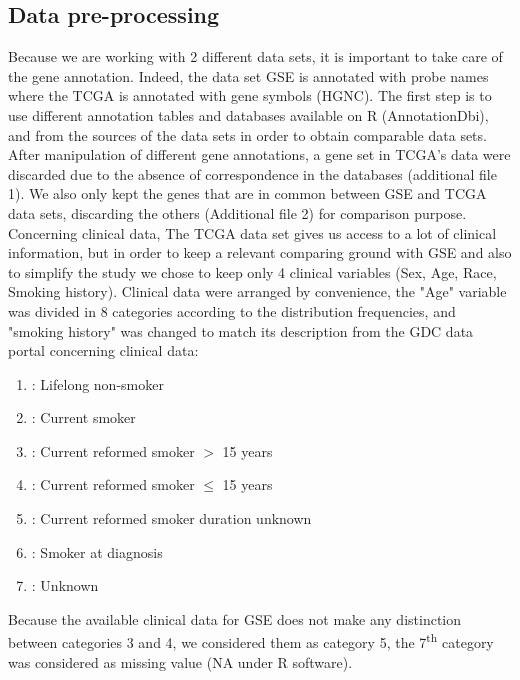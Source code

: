 \documentclass[twocolumn]{article}
\begin{document}
\subsection{Data pre-processing}\label{sec:preprocess}

Because we are working with 2 different data sets, it is important to take care of the gene annotation. Indeed, the data set GSE\cite{shedden} is annotated with probe names where the TCGA\cite{TCGA} is annotated with gene symbols (HGNC).
The first step is to use different annotation tables and databases available on R (AnnotationDbi)\cite{annot}, and from the sources of the data sets in order to obtain comparable data sets.
After manipulation of different gene annotations, a gene set in TCGA's data were discarded due to the absence of correspondence in the databases (additional file 1). We also only kept the genes that are in common between GSE and TCGA data sets, discarding the others (Additional file 2) for comparison purpose.
Concerning clinical data, The TCGA data set gives us access to a lot of clinical information, but in order to keep a relevant comparing ground with GSE and also to simplify the study we chose to keep only 4 clinical variables (Sex, Age, Race, Smoking history).
Clinical data were arranged by convenience, the "Age" variable was divided in 8 categories according to the distribution frequencies, and "smoking history" was changed to match its description from the GDC data portal concerning clinical data:
\begin{enumerate}
    \item : Lifelong non-smoker
    \item : Current smoker
    \item : Current reformed smoker $>$ 15 years
    \item : Current reformed smoker $\leq$ 15 years
    \item : Current reformed smoker duration unknown
    \item : Smoker at diagnosis
    \item : Unknown
\end{enumerate}

Because the available clinical data for GSE does not make any distinction between categories 3 and 4, we considered them as category 5, the 7\textsuperscript{th} category was considered as missing value (NA under R software).
\end{document}
